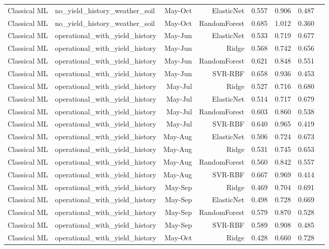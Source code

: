 \begin{tabular}{llrrrrrr}
Classical ML & no\_yield\_history\_weather\_soil & May-Oct & ElasticNet & 0.557 & 0.906 & 0.487 \\
Classical ML & no\_yield\_history\_weather\_soil & May-Oct & RandomForest & 0.685 & 1.012 & 0.360 \\
Classical ML & operational\_with\_yield\_history & May-Jun & ElasticNet & 0.533 & 0.719 & 0.677 \\
Classical ML & operational\_with\_yield\_history & May-Jun & Ridge & 0.568 & 0.742 & 0.656 \\
Classical ML & operational\_with\_yield\_history & May-Jun & RandomForest & 0.621 & 0.848 & 0.551 \\
Classical ML & operational\_with\_yield\_history & May-Jun & SVR-RBF & 0.658 & 0.936 & 0.453 \\
Classical ML & operational\_with\_yield\_history & May-Jul & Ridge & 0.527 & 0.716 & 0.680 \\
Classical ML & operational\_with\_yield\_history & May-Jul & ElasticNet & 0.514 & 0.717 & 0.679 \\
Classical ML & operational\_with\_yield\_history & May-Jul & RandomForest & 0.603 & 0.860 & 0.538 \\
Classical ML & operational\_with\_yield\_history & May-Jul & SVR-RBF & 0.640 & 0.965 & 0.419 \\
Classical ML & operational\_with\_yield\_history & May-Aug & ElasticNet & 0.506 & 0.724 & 0.673 \\
Classical ML & operational\_with\_yield\_history & May-Aug & Ridge & 0.531 & 0.745 & 0.653 \\
Classical ML & operational\_with\_yield\_history & May-Aug & RandomForest & 0.560 & 0.842 & 0.557 \\
Classical ML & operational\_with\_yield\_history & May-Aug & SVR-RBF & 0.667 & 0.969 & 0.414 \\
Classical ML & operational\_with\_yield\_history & May-Sep & Ridge & 0.469 & 0.704 & 0.691 \\
Classical ML & operational\_with\_yield\_history & May-Sep & ElasticNet & 0.498 & 0.728 & 0.669 \\
Classical ML & operational\_with\_yield\_history & May-Sep & RandomForest & 0.579 & 0.870 & 0.528 \\
Classical ML & operational\_with\_yield\_history & May-Sep & SVR-RBF & 0.589 & 0.908 & 0.485 \\
Classical ML & operational\_with\_yield\_history & May-Oct & Ridge & 0.428 & 0.660 & 0.728 \\

\end{tabular}
